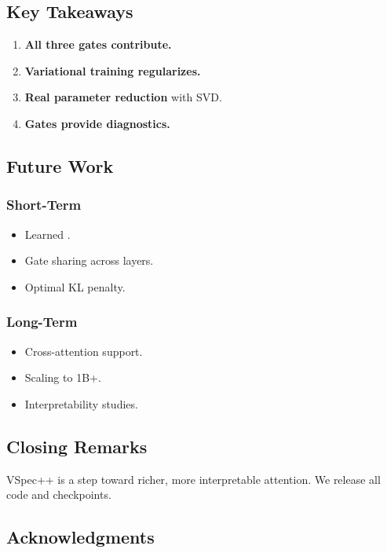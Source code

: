 \subsection{Key Takeaways}

\begin{enumerate}
\item \textbf{All three gates contribute.}
\item \textbf{Variational training regularizes.}
\item \textbf{Real parameter reduction} with SVD.
\item \textbf{Gates provide diagnostics.}

\end{enumerate}
\subsection{Future Work}

\subsubsection{Short-Term}
\begin{itemize}
\item Learned  .
\item Gate sharing across layers.
\item Optimal KL penalty.

\end{itemize}
\subsubsection{Long-Term}
\begin{itemize}
\item Cross-attention support.
\item Scaling to 1B+.
\item Interpretability studies.

\end{itemize}
\subsection{Closing Remarks}

VSpec++ is a step toward richer, more interpretable attention. We release 
all code and checkpoints.

\subsection{Acknowledgments}

